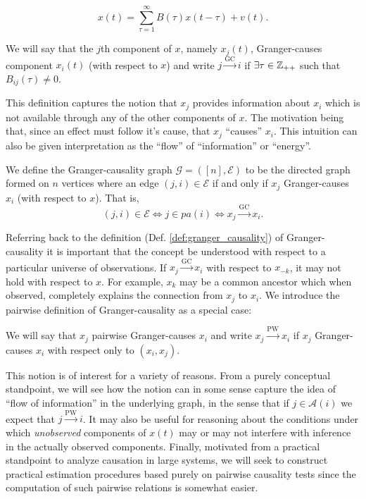 \documentclass[12pt]{article}
\def\gc{\overset{\text{GC}}{\rightarrow}}  %
\def\pwgc{\overset{\text{PW}}{\rightarrow}}  %
\def\gcg{\mathcal{G}}  %
\def\gcge{\mathcal{E}}  %
\newcommand{\pa}[1]{pa(#1)}  %
\newcommand{\anc}[1]{\mathcal{A}(#1)}  %
\begin{document}
\begin{equation}
  \label{eq:var_model}
  x(t) = \sum_{\tau = 1}^\infty B(\tau) x(t - \tau) + v(t).
\end{equation}

\begin{definition}
  \label{def:granger_causality}
  We will say that the $j$th component of $x$, namely $x_j(t)$,
  Granger-causes component $x_i(t)$ (with respect to $x$) and write
  $j \gc i$ if $\exists \tau \in \mathbb{Z}_{++}$ such that $B_{ij}(\tau) \ne 0$.
\end{definition}

This definition captures the notion that $x_j$ provides information
about $x_i$ which is not available through any of the other components
of $x$.  The motivation being that, since an effect must follow it's
cause, that $x_j$ ``causes'' $x_i$.  This intuition can also be given
interpretation as the ``flow'' of ``information'' or ``energy''.

\begin{definition}
  We define the Granger-causality graph $\gcg = ([n], \gcge)$ to be
  the directed graph formed on $n$ vertices where an edge
  $(j, i) \in \gcge$ if and only if $x_j$ Granger-causes $x_i$ (with
  respect to $x$).  That is,
  $$(j, i) \in \gcge \iff j \in \pa{i} \iff x_j \gc x_i.$$
\end{definition}

Referring back to the definition (Def. \ref{def:granger_causality}) of
Granger-causality it is important that the concept be understood with
respect to a particular universe of observations.  If $x_j \gc x_i$
with respect to $x_{-k}$, it may not hold with respect to $x$.  For
example, $x_k$ may be a common ancestor which when observed,
completely explains the connection from $x_j$ to $x_i$.  We introduce
the pairwise definition of Granger-causality as a special case:

\begin{definition}
  We will say that $x_j$ pairwise Granger-causes $x_i$ and write
  $x_j \pwgc x_i$ if $x_j$ Granger-causes $x_i$ with respect only to
  $(x_i, x_j)$.
\end{definition}

This notion is of interest for a variety of reasons.  From a purely
conceptual standpoint, we will see how the notion can in some sense
capture the idea of ``flow of information'' in the underlying graph,
in the sense that if $j \in \anc{i}$ we expect that $j \pwgc i$.  It
may also be useful for reasoning about the conditions under which
\textit{unobserved} components of $x(t)$ may or may not interfere with
inference in the actually observed components.  Finally, motivated
from a practical standpoint to analyze causation in large systems, we
will seek to construct practical estimation procedures based purely on
pairwise causality tests since the computation of such pairwise
relations is somewhat easier.
\end{document}
